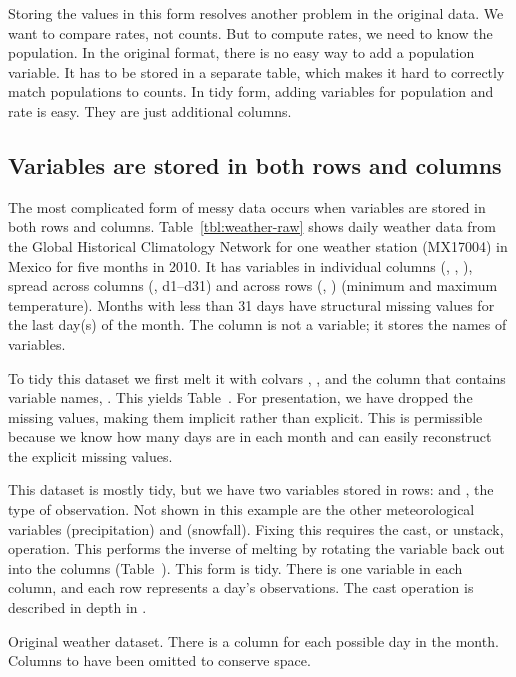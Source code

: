 \documentclass[article]{jss}
\begin{document}
Storing the values in this form resolves another problem in the original data. We want to compare rates, not counts. But to compute rates, we need to know the population. In the original format, there is no easy way to add a population variable. It has to be stored in a separate table, which makes it hard to correctly match populations to counts. In tidy form, adding variables for population and rate is easy. They are just additional columns.

\subsection{Variables are stored in both rows and columns}

The most complicated form of messy data occurs when variables are stored in both rows and columns. Table~\ref{tbl:weather-raw} shows daily weather data from the Global Historical Climatology Network for one weather station (MX17004) in Mexico for five months in 2010. It has variables in individual columns (, , ), spread across columns (, d1--d31) and across rows (, ) (minimum and maximum temperature). Months with less than 31 days have structural missing values for the last day(s) of the month. The  column is not a variable; it stores the names of variables.

To tidy this dataset we first melt it with colvars , ,  and the column that contains variable names, . This yields Table~. For presentation, we have dropped the missing values, making them implicit rather than explicit. This is permissible because we know how many days are in each month and can easily reconstruct the explicit missing values.

This dataset is mostly tidy, but we have two variables stored in rows:  and , the type of observation. Not shown in this example are the other meteorological variables  (precipitation) and  (snowfall). Fixing this requires the cast, or unstack, operation. This performs the inverse of melting by rotating the  variable back out into the columns (Table~). This form is tidy. There is one variable in each column, and each row represents a day's observations. The cast operation is described in depth in \citet{wickham:2007b}.

\begin{table}[htbp]
  \centering
  
  \caption{Original weather dataset.  There is a column for each possible day in the month.  Columns  to  have been omitted to conserve space.}
  \label{tbl:weather-raw}
\end{table}
\end{document}
